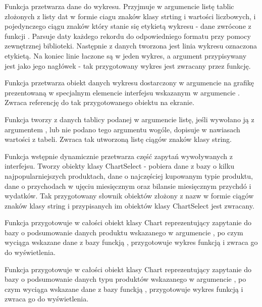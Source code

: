 \documentclass[a4paper,10pt, twoside]{report}
\begin{document}
\medskip
{Funkcja  przetwarza dane do wykresu. 
Przyjmuje w argumencie  listę tablic złożonych z listy dat w 
formie ciagu znaków klasy strting i wartości liczbowych, i pojedynczego ciągu 
znaków który stanie się etykietą wykresu - dane zwrócone z funkcji 
. Parsuje daty każdego rekordu do odpowiedniego 
formatu przy pomocy zewnętrznej biblioteki. Następnie z danych tworzona jest 
linia wykresu oznaczona etykietą. Na koniec linie łaczone są w jeden wykres, a 
argument  przypisywany jest jako jego nagłówek - tak 
przygotowany wykres jest zwracany przez funkcję.}

\medskip
{Funkcja  przetwarza obiekt danych 
wykresu dostarczony w argumencie  na grafikę prezentowaną w 
specjalnym elemencie interfejsu wskazanym w argumencie . 
Zwraca referencję do tak przygotowanego obiektu na ekranie.}

\medskip
{Funkcja  tworzy z danych 
tablicy podanej w argumencie  listę, jeśli wywołano ją z 
argumentem , lub nie podano tego argumentu wogóle, 
dopisuje w nawiasach wartości z tabeli. Zwraca tak utworzoną listę ciągów znaków
 klasy string.}

\medskip
{Funkcja  wstępnie dynamicznie przetwarza część 
zapytań wywoływanych z interfejsu. Tworzy obiekty klasy ChartSelect - pobiera 
dane z bazy o kilku najpopularniejszych produktach, dane o najczęściej kupowanym
 typie produktu, dane o przychodach w ujęciu miesięcznym oraz bilansie 
miesięcznym przychdó i wydatków. Tak przygotowany słownik obiektów złożony z 
nazw w formie ciągów znaków klasy string i przypisanych im obiektów klasy 
ChartSelect jest zwracany.}

\medskip
{Funkcja  przygotowuje w całości obiekt klasy 
Chart reprezentujący zapytanie do bazy o podsumowanie danych produktu wskazanego
 w argumencie , po czym wyciąga wskazane dane z bazy funckją 
, przygotowuje wykres funkcją 
 i zwraca go do wyświetlenia.}

\medskip
{Funkcja  przygotowuje w całości obiekt klasy 
Chart reprezentujący zapytanie do bazy o podsumowanie danych typu produktów 
wskazanego w argumencie , po czym wyciąga wskazane dane z bazy 
funckją , przygotowuje wykres funkcją 
 i zwraca go do wyświetlenia.}
\end{document}
